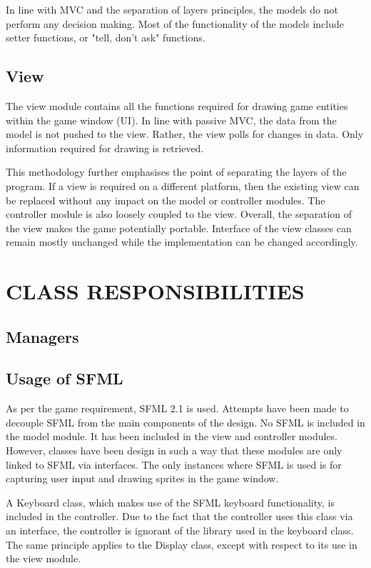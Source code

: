 \documentclass[10pt,twocolumn]{witseiepaper}
\begin{document}
In line with MVC and the separation of layers principles, the models do not perform any decision making. Most of the functionality of the models include setter functions, or "tell, don't ask" functions.

\subsection{View}
The view module contains all the functions required for drawing game entities within the game window (UI). In line with passive MVC, the data from the model is not pushed to the view. Rather, the view polls for changes in data. Only information required for drawing is retrieved. 

This methodology further emphasises the point of separating the layers of the program. If a view is required on a different platform, then the existing view can be replaced without any impact on the model or controller modules. The controller module is also loosely coupled to the view. Overall, the separation of the view makes the game potentially portable. Interface of the view classes can remain mostly unchanged while the implementation can be changed accordingly.

%
\section{CLASS RESPONSIBILITIES} %

\subsection{Managers}

\subsection{Usage of SFML} %
As per the game requirement, SFML 2.1 is used. Attempts have been made to decouple SFML from the main components of the design. No SFML is included in the model module. It has been included in the view and controller modules. However, classes have been design in such a way that these modules are only linked to SFML via interfaces. The only instances where SFML is used is for capturing user input and drawing sprites in the game window.

A Keyboard class, which makes use of the SFML keyboard functionality, is included in the controller. Due to the fact that the controller uses this class via an interface, the controller is ignorant of the library used in the keyboard class. The same principle applies to the Display class, except with respect to its use in the view module. 
\end{document}
